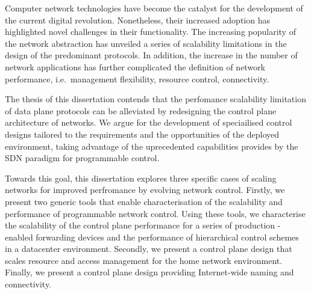 


\begin{abstractslong}    %

Computer network technologies have become the catalyst for the development of
the current digital revolution. Nonetheless, their increased adoption has
highlighted novel challenges in their functionality. The increasing popularity
of the network abstraction has unveiled a series of scalability limitations in
the design of the predominant protocols. In addition, the increase in the number
of network applications has further complicated the definition of network
performance, i.e.~management flexibility, resource control, connectivity. 

The thesis of this dissertation contends that the perfomance scalability
limitation of data plane protocols can be alleviated by redesigning the control
plane architecture of networks. We argue for the development of speciailised
control designs tailored to the requirements and the opportunities of the
deployed environment, taking advantage of the uprecedented capabilities provides
by the SDN paradigm for programmable control. 

Towards this goal, this dissertation explores three specific cases of scaling
networks for improved perfromance by evolving network control. Firstly, we
present two generic tools that enable characterisation of the scalability and
performance of programmable network control. Using these tools, we characterise
the scalability of the control plane performance for a series of production
\of-enabled forwarding devices and the performance of hierarchical control
schemes in a datacenter environment. Secondly, we present a control plane design
that scales resource and access management for the home network environment.
Finally, we present a control plane design providing Internet-wide naming and
connectivity. 

\end{abstractslong}





